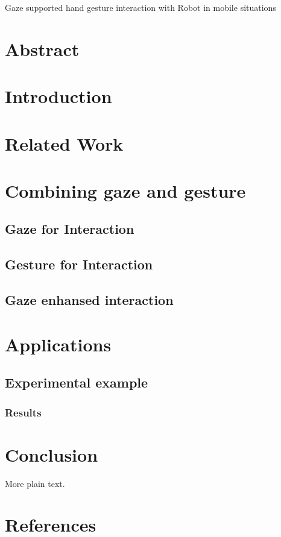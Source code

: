 \documentclass{article}
\begin{document}
Gaze supported hand gesture interaction with Robot in mobile situations

\section{Abstract}
\section{Introduction}
\section{Related Work}
\section{Combining gaze and gesture}
\subsection{Gaze for Interaction}
\subsection{Gesture for Interaction}
%
\subsection{Gaze enhansed interaction }
\section{Applications}
\subsection{Experimental example}
\subsubsection{}

\subsubsection{}
\subsubsection{Results}

\section{Conclusion}

More plain text.
\section{References}
\end{document}
